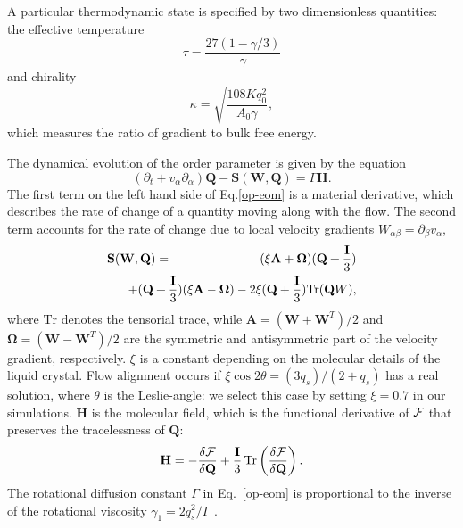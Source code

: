 \documentclass[aps,pre,reprint,superscriptaddress, twocolumn]{revtex4}
\begin{document}
A particular thermodynamic state is specified by two dimensionless quantities: the effective temperature 
\begin{equation}
\tau=\frac{27(1-\gamma/3)}{\gamma}
\end{equation}
and chirality 
\begin{equation}
\kappa=\sqrt{\frac{108 K q_0^2}{A_0 \gamma}},
\end{equation}
which measures the ratio of gradient to bulk free energy.

The dynamical evolution of the order parameter is given by the equation 
\begin{equation}
\left(\partial_t+ v_\alpha \partial_\alpha \right){\mathbf Q} - {\mathbf S}({\mathbf W},{\mathbf Q}) = \Gamma {\mathbf H}.
\label{op-eom}
\end{equation}
The first term on the left hand side of Eq.\ref{op-eom} is a material derivative, which describes the rate of change of a quantity moving along with the flow.
The second term accounts for the rate of change due to local velocity gradients $W_{\alpha \beta}=\partial_\beta v_\alpha$,
\begin{eqnarray}
{\mathbf S}({\mathbf W}, {\mathbf Q}) &=& (\xi {\mathbf A} + {\boldsymbol \Omega})({\mathbf Q}+\frac{\mathbf I}{3})\nonumber\\
& &\hspace*{-1.5cm}+ ({\mathbf Q}+\frac{\mathbf I}{3})(\xi {\mathbf A}  - {\boldsymbol \Omega})-2 \xi ({\mathbf Q}+\frac{\mathbf I}{3})
\mathrm{Tr}({\mathbf Q W}),
\label{sw}
\end{eqnarray}
where $\mathrm{Tr}$ denotes the tensorial trace, while 
${\mathbf A}=({\mathbf W}+{\mathbf W}^T)/2$ and
${\boldsymbol \Omega}=({\mathbf W}-{\mathbf W}^T)/2$ are the symmetric and antisymmetric part of the velocity gradient, respectively. $\xi$ 
is a constant depending on the molecular details of the liquid crystal.
Flow alignment occurs if $\xi \cos{2\theta}=(3q_s)/(2+q_s)$ has a real solution, where $\theta$ is the Leslie-angle: we select this case by 
setting $\xi=0.7$ in our simulations.
${\mathbf H}$ is the molecular field, which is the functional derivative of $\cal F$ that preserves the tracelessness of $\mathbf Q$:
\begin{equation}
{\bf H}=-\frac{\delta {\cal F}}{\delta {\bf Q}}+\frac{\bf I}{3}\,
\mathrm{Tr} \left(\frac{\delta {\cal F}}{\delta {\bf Q}}\right).
\label{molfield}
\end{equation}
The rotational diffusion constant $\Gamma$ in Eq.~\ref{op-eom} is proportional
to the inverse of the rotational viscosity $\gamma_1=2 q_s^2/\Gamma$
\cite{deGennes}.
\end{document}
